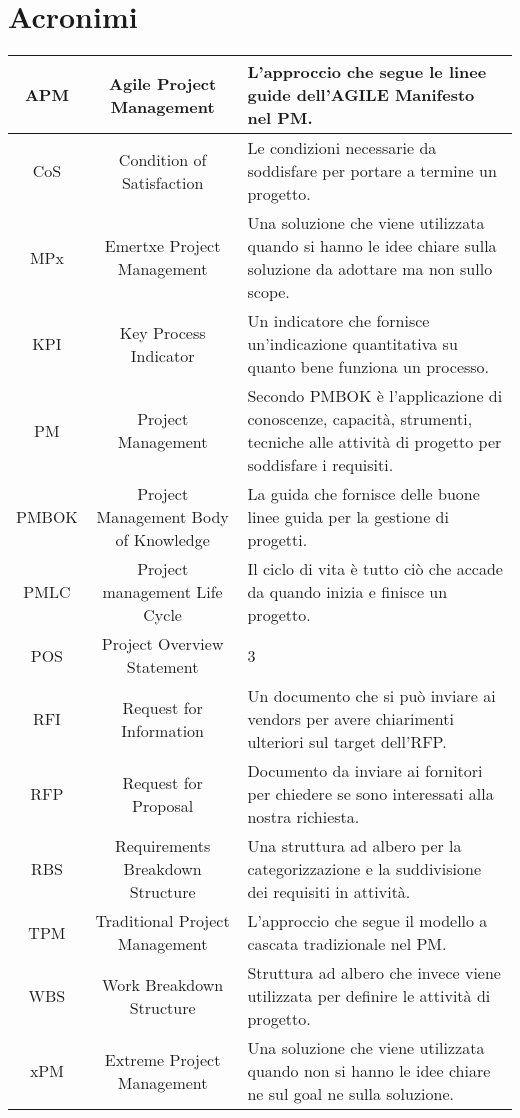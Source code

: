 \section{Acronimi}

\begin{tabularx}{\textwidth}{|c|c|X|}
	\hline			
	APM & Agile Project Management & L'approccio che segue le linee guide dell'AGILE Manifesto nel PM.\\
	\hline
	CoS & Condition of Satisfaction & Le condizioni necessarie da soddisfare per portare a termine un progetto. \\
	\hline
	MPx & Emertxe Project Management & 
	Una soluzione che viene utilizzata quando si hanno le idee chiare sulla soluzione da adottare ma non sullo scope.\\
	\hline  
	KPI & Key Process Indicator & Un indicatore che fornisce un'indicazione quantitativa su quanto bene funziona un processo. \\
	\hline  
	PM & Project Management & Secondo PMBOK è l'applicazione di conoscenze, capacità, strumenti, tecniche alle attività di progetto per soddisfare i requisiti.\\
	\hline		
	PMBOK & Project Management Body of Knowledge & La guida che fornisce delle buone linee guida per la gestione di progetti.\\
	\hline  
	PMLC & Project management Life Cycle & Il ciclo di vita è tutto ciò che accade da quando inizia e finisce un progetto.\\
	\hline
	POS & Project Overview Statement & 3 \\
	\hline
	RFI & Request for Information & Un documento che si può inviare ai vendors per avere chiarimenti ulteriori sul target dell'RFP. \\
	\hline
	RFP & Request for Proposal & Documento da inviare ai fornitori per chiedere se sono interessati alla nostra richiesta. \\
	\hline
	RBS & Requirements Breakdown Structure & Una struttura ad albero per la categorizzazione e la suddivisione dei requisiti in attività. \\
	\hline
	TPM & Traditional Project Management & L'approccio che segue il modello a cascata tradizionale nel PM. \\
	\hline  
	WBS & Work Breakdown Structure & Struttura ad albero che invece viene utilizzata per definire le attività di progetto.\\
	\hline  
	xPM & Extreme Project Management &  Una soluzione che viene utilizzata quando non si hanno le idee chiare ne sul goal ne sulla soluzione.\\
	\hline
\end{tabularx}
